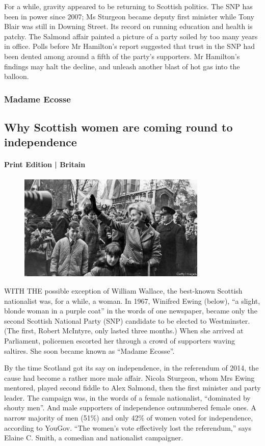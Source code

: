 \documentclass{article}
\begin{document}
For a while, gravity appeared to be returning to Scottish politics. The SNP has been in power since 2007; Ms Sturgeon became deputy first minister while Tony Blair was still in Downing Street. Its record on running education and health is patchy. The Salmond affair painted a picture of a party soiled by too many years in office. Polls before Mr Hamilton's report suggested that trust in the SNP had been dented among around a fifth of the party's supporters. Mr Hamilton's findings may halt the decline, and unleash another blast of hot gas into the balloon. {} 
\clearpage
\subsubsection{Madame Ecosse }
\subsection{Why Scottish women are coming round to independence }
\paragraph{Print Edition | Britain  \quad \color{gray}{Mar 27th 2021 }}
\begin{figure}[h]
\centering
\includegraphics[width=0.8\textwidth]{images/20210327_brp502.jpg}
\end{figure}
\lettrine{W}ITH THE possible exception of William Wallace, the best-known Scottish nationalist was, for a while, a woman. In 1967, Winifred Ewing (below), ``a slight, blonde woman in a purple coat'' in the words of one newspaper, became only the second Scottish National Party (SNP) candidate to be elected to Westminster. (The first, Robert McIntyre, only lasted three months.) When she arrived at Parliament, policemen escorted her through a crowd of supporters waving saltires. She soon became known as ``Madame Ecosse''. 

By the time Scotland got its say on independence, in the referendum of 2014, the cause had become a rather more male affair. Nicola Sturgeon, whom Mrs Ewing mentored, played second fiddle to Alex Salmond, then the first minister and party leader. The campaign was, in the words of a female nationalist, ``dominated by shouty men''. And male supporters of independence outnumbered female ones. A narrow majority of men (51\%) and only 42\% of women voted for independence, according to YouGov. ``The women's vote effectively lost the referendum,'' says Elaine C. Smith, a comedian and nationalist campaigner. 
\end{document}
